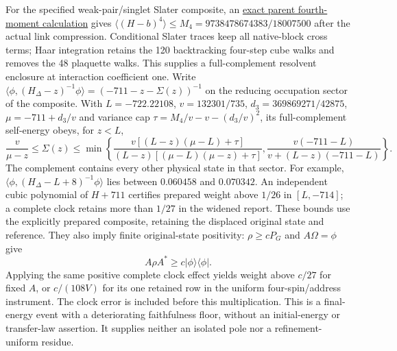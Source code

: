 For the specified weak-pair/singlet Slater composite, an
\href{https://github.com/FloatingPragma/observer-patch-holography/blob/main/model/particle_primary_odd_resolvent/PROOF.md}{exact parent fourth-moment calculation}
gives $\langle(H-b)^4\rangle\le M_4=9738478674383/18007500$ after the actual
link compression. Conditional Slater traces keep all native-block cross
terms; Haar integration retains the 120 backtracking four-step cube
walks and removes the 48 plaquette walks. This supplies a full-complement
resolvent enclosure at interaction coefficient one. Write
$\langle\phi,(H_\Delta-z)^{-1}\phi\rangle=(-711-z-\Sigma(z))^{-1}$
on the reducing occupation sector of the composite.
With $L=-722.22108$, $v=132301/735$, $d_3=369869271/42875$,
$\mu=-711+d_3/v$ and variance cap $\tau=M_4/v-v-(d_3/v)^2$,
its full-complement self-energy obeys, for $z<L$,
\[
 \frac{v}{\mu-z}\le\Sigma(z)\le
 \min\left\{\frac{v[(L-z)(\mu-L)+\tau]}
 {(L-z)[(\mu-L)(\mu-z)+\tau]},
 \frac{v(-711-L)}{v+(L-z)(-711-L)}\right\}.
\]
The complement contains every other physical state in that sector. For example,
$\langle\phi,(H_\Delta-L+8)^{-1}\phi\rangle$ lies between $0.060458$ and
$0.070342$. An independent cubic polynomial of $H+711$ certifies
prepared weight above $1/26$ in $[L,-714]$; a complete clock retains
more than $1/27$ in the widened report. These bounds use the explicitly
prepared composite, retaining the displaced original state and reference.
They also imply finite original-state positivity: $\rho\ge cP_G$ and
$A\Omega=\phi$ give
\[
 A\rho A^*\ge c|\phi\rangle\langle\phi|.
\]
Applying the same positive complete clock effect yields weight above
$c/27$ for fixed $A$, or $c/(108V)$ for its one retained row in the
uniform four-spin/address instrument. The clock error is included before
this multiplication. This is a final-energy event with a deteriorating
faithfulness floor, without an initial-energy or transfer-law assertion.
It supplies neither an isolated pole nor a refinement-uniform residue.

